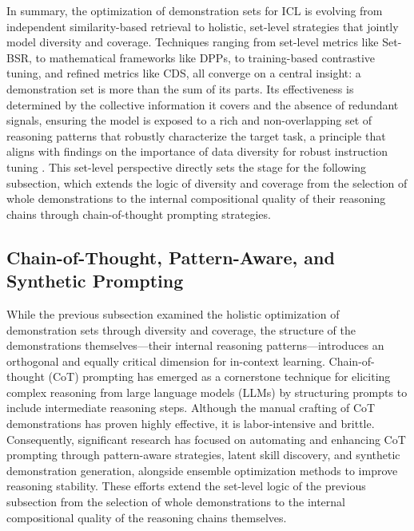 \documentclass[11pt]{article}
\begin{document}
In summary, the optimization of demonstration sets for ICL is evolving from independent similarity-based retrieval to holistic, set-level strategies that jointly model diversity and coverage. Techniques ranging from set-level metrics like Set-BSR, to mathematical frameworks like DPPs, to training-based contrastive tuning, and refined metrics like CDS, all converge on a central insight: a demonstration set is more than the sum of its parts. Its effectiveness is determined by the collective information it covers and the absence of redundant signals, ensuring the model is exposed to a rich and non-overlapping set of reasoning patterns that robustly characterize the target task, a principle that aligns with findings on the importance of data diversity for robust instruction tuning \cite{ref144}. This set-level perspective directly sets the stage for the following subsection, which extends the logic of diversity and coverage from the selection of whole demonstrations to the internal compositional quality of their reasoning chains through chain-of-thought prompting strategies.

\subsection{Chain-of-Thought, Pattern-Aware, and Synthetic Prompting}

While the previous subsection examined the holistic optimization of demonstration sets through diversity and coverage, the structure of the demonstrations themselves---their internal reasoning patterns---introduces an orthogonal and equally critical dimension for in-context learning. Chain-of-thought (CoT) prompting has emerged as a cornerstone technique for eliciting complex reasoning from large language models (LLMs) by structuring prompts to include intermediate reasoning steps. Although the manual crafting of CoT demonstrations has proven highly effective, it is labor-intensive and brittle. Consequently, significant research has focused on automating and enhancing CoT prompting through pattern-aware strategies, latent skill discovery, and synthetic demonstration generation, alongside ensemble optimization methods to improve reasoning stability. These efforts extend the set-level logic of the previous subsection from the selection of whole demonstrations to the internal compositional quality of the reasoning chains themselves.
\end{document}
